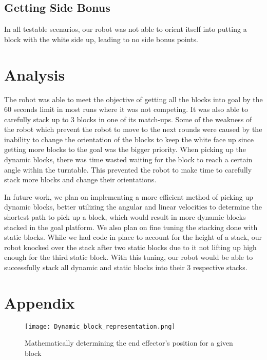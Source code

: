 \documentclass{article}
\begin{document}
     \subsection{Getting Side Bonus}
        In all testable scenarios, our robot was not able to orient itself into putting a block with the white side up, leading to no side bonus points.
 
\section{Analysis}
The robot was able to meet the objective of getting all the blocks into goal by the 60 seconds limit in most runs where it was not competing. It was also able to carefully stack up to 3 blocks in one of its match-ups. Some of the weakness of the robot which prevent the robot to move to the next rounds were caused by the inability to change the orientation of the blocks to keep the white face up since getting more blocks to the goal was the bigger priority. When picking up the dynamic blocks, there was time wasted waiting for the block to reach a certain angle within the turntable. This prevented the robot to make time to carefully stack more blocks and change their orientations. 

In future work, we plan on implementing a more efficient method of picking up dynamic blocks, better utilizing the angular and linear velocities to determine the shortest path to pick up a block, which would result in more dynamic blocks stacked in the goal platform.  We also plan on fine tuning the stacking done with static blocks.  While we had code in place to account for the height of a stack, our robot knocked over the stack after two static blocks due to it not lifting up high enough for the third static block.  With this tuning, our robot would be able to successfully stack all dynamic and static blocks into their 3 respective stacks.
\newpage

\section{Appendix}

\begin{figure}[h]
\centering
\texttt{[image: Dynamic\_block\_representation.png]}
\caption{Mathematically determining the end effector's position for a given block}
\label{dyn2}
\end{figure}
    
\end{document}
